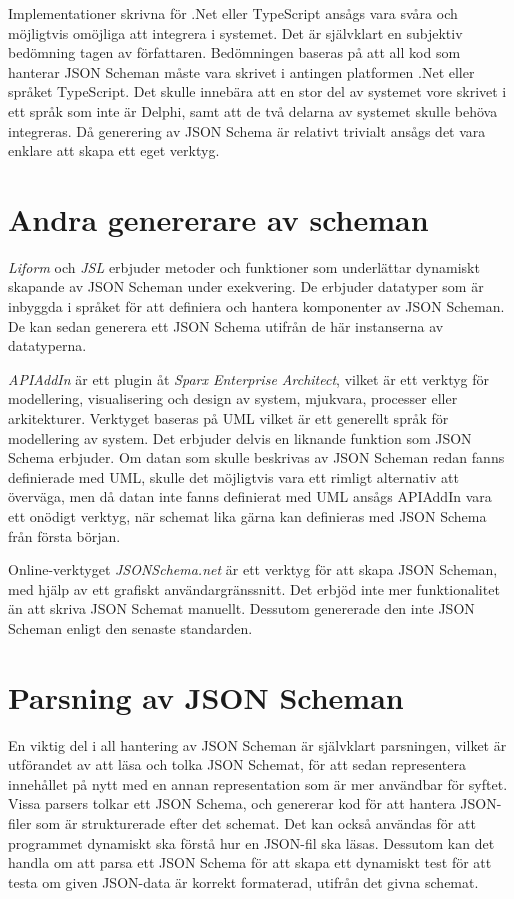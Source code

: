 Implementationer skrivna för .Net eller TypeScript ansågs vara svåra och möjligtvis omöjliga att integrera i systemet. Det är självklart en subjektiv bedömning tagen av författaren. Bedömningen baseras på att all kod som hanterar JSON Scheman måste vara skrivet i antingen platformen .Net eller språket TypeScript. Det skulle innebära att en stor del av systemet vore skrivet i ett språk som inte är Delphi, samt att de två delarna av systemet skulle behöva integreras. Då generering av JSON Schema är relativt trivialt ansågs det vara enklare att skapa ett eget verktyg.

\section{Andra genererare av scheman}
\textit{Liform} och \textit{JSL} erbjuder metoder och funktioner som underlättar dynamiskt skapande av JSON Scheman under exekvering. De erbjuder datatyper som är inbyggda i språket för att definiera och hantera komponenter av JSON Scheman. De kan sedan generera ett JSON Schema utifrån de här instanserna av datatyperna. \cite{Romanovich,Limenius}

\textit{APIAddIn} är ett plugin åt \textit{Sparx Enterprise Architect}, vilket är ett verktyg för modellering, visualisering och design av system, mjukvara, processer eller arkitekturer. Verktyget baseras på UML vilket är ett generellt språk för modellering av system. Det erbjuder delvis en liknande funktion som JSON Schema erbjuder. Om datan som skulle beskrivas av JSON Scheman redan fanns definierade med UML, skulle det möjligtvis vara ett rimligt alternativ att överväga, men då datan inte fanns definierat med UML ansågs APIAddIn vara ett onödigt verktyg, när schemat lika gärna kan definieras med JSON Schema från första början. \cite{Tomlinson}

Online-verktyget \textit{JSONSchema.net} är ett verktyg för att skapa JSON Scheman, med hjälp av ett grafiskt användargränssnitt. Det erbjöd inte mer funktionalitet än att skriva JSON Schemat manuellt. Dessutom genererade den inte JSON Scheman enligt den senaste standarden. \cite{Jackwootton}

\section{Parsning av JSON Scheman}

En viktig del i all hantering av JSON Scheman är självklart parsningen, vilket är utförandet av att läsa och tolka JSON Schemat, för att sedan representera innehållet på nytt med en annan representation som är mer användbar för syftet. Vissa parsers tolkar ett JSON Schema, och genererar kod för att hantera JSON-filer som är strukturerade efter det schemat. Det kan också användas för att programmet dynamiskt ska förstå hur en JSON-fil ska läsas. Dessutom kan det handla om att parsa ett JSON Schema för att skapa ett dynamiskt test för att testa om given JSON-data är korrekt formaterad, utifrån det givna schemat.

